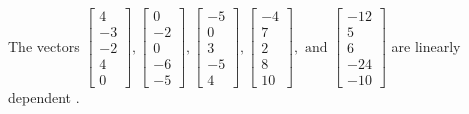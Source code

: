 \begin{exercise}
\begin{exerciseStatement}
  \end{exerciseStatement}
  \begin{exerciseAnswer}
   The vectors \(\left[\begin{array}{r}
4 \\
-3 \\
-2 \\
4 \\
0
\end{array}\right] , \left[\begin{array}{r}
0 \\
-2 \\
0 \\
-6 \\
-5
\end{array}\right] , \left[\begin{array}{r}
-5 \\
0 \\
3 \\
-5 \\
4
\end{array}\right] , \left[\begin{array}{r}
-4 \\
7 \\
2 \\
8 \\
10
\end{array}\right] , \text{ and } \left[\begin{array}{r}
-12 \\
5 \\
6 \\
-24 \\
-10
\end{array}\right]\) are 
  	 linearly dependent  .
  


  \end{exerciseAnswer}
\end{exercise}